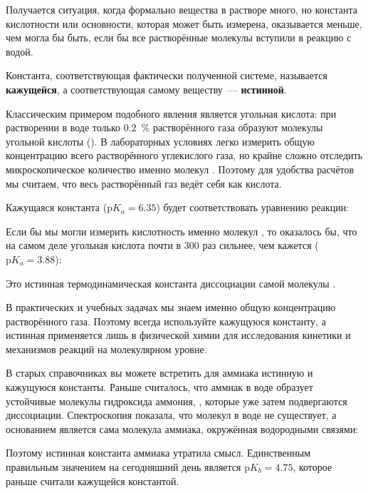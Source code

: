 Получается ситуация, когда формально вещества в растворе много, но константа кислотности или основности, которая может быть измерена, оказывается меньше, чем могла бы быть, если бы все растворённые молекулы вступили в реакцию с водой.

Константа, соответствующая фактически полученной системе, называется \textbf{кажущейся}, а соответствующая самому веществу~--- \textbf{истинной}.

Классическим примером подобного явления является угольная кислота: при растворении  в воде только \qty{0,2}{\percent} растворённого газа образуют молекулы угольной кислоты (). В лабораторных условиях легко измерить общую концентрацию всего растворённого углекислого газа, но крайне сложно отследить микроскопическое количество именно молекул . Поэтому для удобства расчётов мы считаем, что весь растворённый газ ведёт себя как кислота.

Кажущаяся константа ($\mathrm{p}K_a = \num{6,35}$) будет соответствовать уравнению реакции:


Если бы мы могли измерить кислотность именно молекул , то оказалось бы, что на самом деле угольная кислота почти в 300 раз сильнее, чем кажется ($\mathrm{p}K_a = \num{3,88}$):


Это истинная термодинамическая константа диссоциации самой молекулы .

В практических и учебных задачах мы знаем именно общую концентрацию растворённого газа. Поэтому всегда используйте кажущуюся константу, а истинная применяется лишь в физической химии для исследования кинетики и механизмов реакций на молекулярном уровне.

В старых справочниках вы можете встретить для аммиака истинную и кажущуюся константы. Раньше считалось, что аммиак в воде образует устойчивые молекулы гидроксида аммония, , которые уже затем подвергаются диссоциации. Спектроскопия показала, что молекул  в воде не существует, а основанием является сама молекула аммиака, окружённая водородными связями:


Поэтому истинная константа аммиака утратила смысл. Единственным правильным значением на сегодняшний день является $\mathrm{p}K_b = \num{4,75}$, которое раньше считали кажущейся константой.


